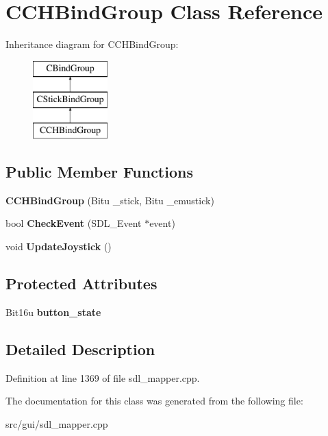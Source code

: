 \hypertarget{classCCHBindGroup}{\section{C\-C\-H\-Bind\-Group Class Reference}
\label{classCCHBindGroup}
}
Inheritance diagram for C\-C\-H\-Bind\-Group\-:\begin{figure}[H]
\begin{center}
\leavevmode
\includegraphics[height=3.000000cm]{classCCHBindGroup}
\end{center}
\end{figure}
\subsection*{Public Member Functions}
\begin{DoxyCompactItemize}
\item 
\hypertarget{classCCHBindGroup_a86bb3a7458f395324aae896cbe02f4dd}{{\bfseries C\-C\-H\-Bind\-Group} (Bitu \-\_\-stick, Bitu \-\_\-emustick)}\label{classCCHBindGroup_a86bb3a7458f395324aae896cbe02f4dd}

\item 
\hypertarget{classCCHBindGroup_a33b9f9ced9bf284c83219c33aa81bfe0}{bool {\bfseries Check\-Event} (S\-D\-L\-\_\-\-Event $\ast$event)}\label{classCCHBindGroup_a33b9f9ced9bf284c83219c33aa81bfe0}

\item 
\hypertarget{classCCHBindGroup_a11232134bcf2b6f8257f8103d34d2a13}{void {\bfseries Update\-Joystick} ()}\label{classCCHBindGroup_a11232134bcf2b6f8257f8103d34d2a13}

\end{DoxyCompactItemize}
\subsection*{Protected Attributes}
\begin{DoxyCompactItemize}
\item 
\hypertarget{classCCHBindGroup_a0d3a52894ed32833a5942a5b0e507c56}{Bit16u {\bfseries button\-\_\-state}}\label{classCCHBindGroup_a0d3a52894ed32833a5942a5b0e507c56}

\end{DoxyCompactItemize}


\subsection{Detailed Description}


Definition at line 1369 of file sdl\-\_\-mapper.\-cpp.



The documentation for this class was generated from the following file\-:\begin{DoxyCompactItemize}
\item 
src/gui/sdl\-\_\-mapper.\-cpp\end{DoxyCompactItemize}
